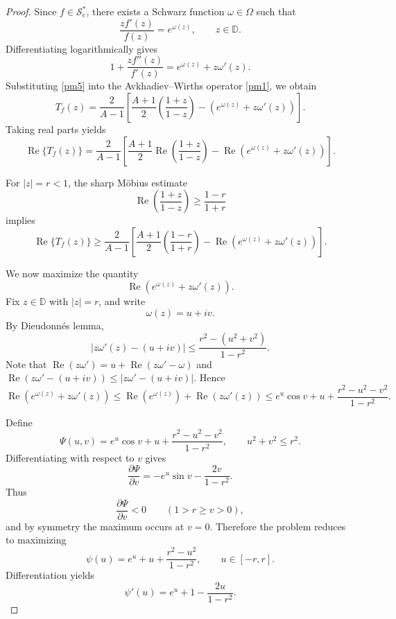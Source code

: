 \documentclass[10pt,a4paper]{amsart}
\renewcommand{\Re}{\operatorname{Re}}
\begin{document}
\begin{proof}
Since $f\in\mathcal{S}_e^*$, there exists a Schwarz function $\omega\in\Omega$ such that
\begin{equation}\label{pm4}
\frac{zf'(z)}{f(z)} = e^{\omega(z)}, \qquad z\in\mathbb{D}.
\end{equation}
Differentiating logarithmically gives
\begin{equation}\label{pm5}
1+\frac{zf''(z)}{f'(z)}
=
e^{\omega(z)}+z\omega'(z).
\end{equation}
Substituting \eqref{pm5} into the Avkhadiev--Wirths operator \eqref{pm1}, we obtain
\begin{equation}\label{pm6}
T_f(z)
=
\frac{2}{A-1}
\left[
\frac{A+1}{2}\left(\frac{1+z}{1-z}\right)
-
\left(e^{\omega(z)}+z\omega'(z)\right)
\right].
\end{equation}
Taking real parts yields
\begin{equation}\label{pm7}
\Re\{T_f(z)\}
=
\frac{2}{A-1}
\left[
\frac{A+1}{2}
\Re\left(\frac{1+z}{1-z}\right)
-
\Re\left(e^{\omega(z)}+z\omega'(z)\right)
\right].
\end{equation}

For $|z|=r<1$, the sharp M\"obius estimate
\[
\Re\left(\frac{1+z}{1-z}\right)
\ge
\frac{1-r}{1+r}
\]
implies
\begin{equation}\label{pm8}
\Re\{T_f(z)\}
\ge
\frac{2}{A-1}
\left[
\frac{A+1}{2}\left(\frac{1-r}{1+r}\right)
-
\Re\left(e^{\omega(z)}+z\omega'(z)\right)
\right].
\end{equation}

We now maximize the quantity
\[
\Re\left(e^{\omega(z)}+z\omega'(z)\right).
\]
Fix $z\in\mathbb{D}$ with $|z|=r$, and write
\[
\omega(z)=u+iv.
\]
By Dieudonn\'es lemma,
\begin{equation}\label{pm9}
\left|
z\omega'(z)-(u+iv)
\right|
\le
\frac{r^2-(u^2+v^2)}{1-r^2}.
\end{equation}
Note that $\Re(z\omega')=u+\Re(z\omega'-\omega)$ and $\Re(z\omega'-(u+iv))\leq |z\omega'-(u+iv)|$.
Hence
\begin{equation}\label{pm10}
\Re\left(e^{\omega(z)}+z\omega'(z)\right)
\le \Re\left(e^{\omega(z)}\right)+\Re\left(z\omega'(z)\right)\leq
e^u\cos v
+
u
+
\frac{r^2-u^2-v^2}{1-r^2}.
\end{equation}

Define
\begin{equation}\label{pm_psi_def}
\Psi(u,v)
=
e^u\cos v
+
u
+
\frac{r^2-u^2-v^2}{1-r^2},
\qquad
u^2+v^2\le r^2.
\end{equation}
Differentiating with respect to $v$ gives
\[
\frac{\partial\Psi}{\partial v}
=
-e^u\sin v
-
\frac{2v}{1-r^2}.
\]
Thus
\[
\frac{\partial\Psi}{\partial v}<0
\qquad
(1>r\geq v>0),
\]
and by symmetry the maximum occurs at $v=0$. Therefore the problem reduces to maximizing
\begin{equation}\label{pm_psi_u_def}
\psi(u)
=
e^u
+
u
+
\frac{r^2-u^2}{1-r^2},
\qquad
u\in[-r,r].
\end{equation}
Differentiation yields
\begin{equation}\label{pm_psi_prime}
\psi'(u)
=
e^u
+
1
-
\frac{2u}{1-r^2}.
\end{equation}


\end{proof}
\end{document}

